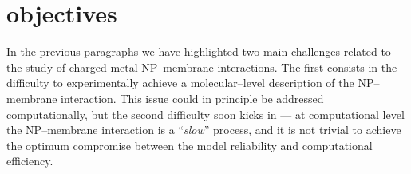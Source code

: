 

\section{objectives}
In the previous paragraphs we have highlighted two main challenges related to the study of charged metal 
\ac{NP}--membrane interactions. The first consists in the difficulty to experimentally achieve a molecular--level 
description of the \ac{NP}--membrane interaction. This issue could in principle be addressed computationally, but 
the second difficulty soon kicks in --- at computational level the \ac{NP}--membrane interaction is a 
``\textit{slow}'' process, and it is not trivial to achieve the optimum compromise between the model reliability 
and computational efficiency.


